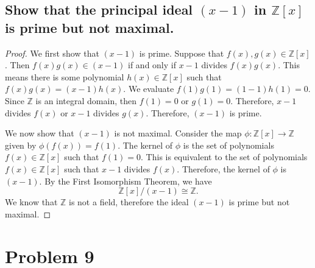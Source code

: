 \documentclass{article}
\theoremstyle{plain} %
\theoremstyle{definition} %
\begin{document}
\subsection*{Show that the principal ideal $(x-1)$ in $\mathbb{Z}[x]$ is
prime but not maximal.}
\begin{proof}
    We first show that $(x-1)$ is prime. Suppose that $f(x), g(x) \in \mathbb{Z}[x]$. Then $f(x)g(x) \in (x-1)$ if and only if $x-1$ divides $f(x)g(x)$.
    This means there is some polynomial $h(x) \in \mathbb{Z}[x]$ such that $f(x)g(x) = (x-1)h(x)$.
    We evaluate $f(1)g(1) = (1-1)h(1) = 0$.
    Since $\mathbb{Z}$ is an integral domain, then $f(1) = 0$ or $g(1) = 0$.
    Therefore, $x-1$ divides $f(x)$ or $x-1$ divides $g(x)$.
    Therefore, $(x-1)$ is prime.

    We now show that $(x-1)$ is not maximal.
    Consider the map $\phi: \mathbb{Z}[x] \to \mathbb{Z}$ given by $\phi(f(x)) = f(1)$.
    The kernel of $\phi$ is the set of polynomials $f(x) \in \mathbb{Z}[x]$ such that $f(1) = 0$.
    This is equivalent to the set of polynomials $f(x) \in \mathbb{Z}[x]$ such that $x-1$ divides $f(x)$.
    Therefore, the kernel of $\phi$ is $(x-1)$.
    By the First Isomorphism Theorem, we have
    \[
        \mathbb{Z}[x]/(x-1) \cong \mathbb{Z}.
    \]
    We know that $\mathbb{Z}$ is not a field, therefore the ideal $(x-1)$ is prime but not maximal.
\end{proof}

\section*{Problem 9}
\end{document}

